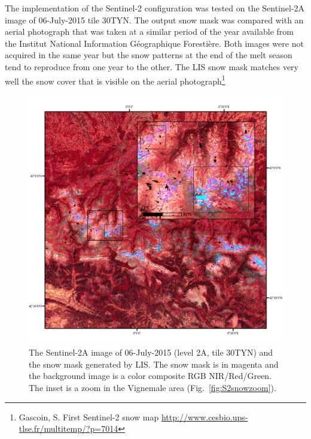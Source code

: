 \documentclass[a4paper]{article}
\begin{document}
The implementation of the Sentinel-2 configuration was tested on the Sentinel-2A image of 06-July-2015 tile 30TYN. The output snow mask was compared with an aerial photograph that was taken at a similar period of the year available from the Institut National Information Géographique Forestière. Both images were not acquired in the same year but the snow patterns at the end of the melt season tend to reproduce from one year to the other. The LIS snow mask matches very well the snow cover that is visible on the aerial photograph\footnote{Gascoin, S. First Sentinel-2 snow map \url{http://www.cesbio.ups-tlse.fr/multitemp/?p=7014}}

\begin{figure}[h]
 \centering
 \includegraphics[width=\textwidth]{./images/S2snow.png}
 \caption{The Sentinel-2A image of 06-July-2015 (level 2A, tile 30TYN) and the snow mask generated by LIS. The snow mask is in magenta and the background image is a color composite RGB NIR/Red/Green. The inset is a zoom in the Vignemale area (Fig.~\ref{fig:S2snowzoom}).}
 \label{fig:S2snow}
\end{figure}
\end{document}
